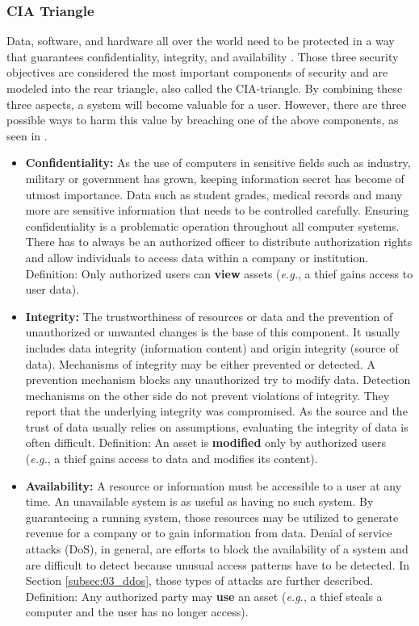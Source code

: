 \subsubsection{CIA Triangle}
Data, software, and hardware all over the world need to be protected in a way that guarantees confidentiality, integrity, and availability \cite{Pfleeger2014}. Those three security objectives are considered the most important components of security and are modeled into the rear triangle, also called the CIA-triangle. By combining these three aspects, a system will become valuable for a user. However, there are three possible ways to harm this value by breaching one of the above components, as seen in \cite{Bishop2004}.
\begin{itemize}
  \item \textbf{Confidentiality:} As the use of computers in sensitive fields such as industry, military or government has grown, keeping information secret has become of utmost importance. Data such as student grades, medical records and many more are sensitive information that needs to be controlled carefully. Ensuring confidentiality is a problematic operation throughout all computer systems. There has to always be an authorized officer to distribute  authorization rights and allow individuals to access data within a company or institution.
        \subitem Definition: Only authorized users can \textbf{view} assets (\textit{e.g.}, a thief gains access to user data).
  \item \textbf{Integrity:} The trustworthiness of resources or data and the prevention of unauthorized or unwanted changes is the base of this component. It usually includes data integrity (information content) and origin integrity (source of data). Mechanisms of integrity may be either prevented or detected. A prevention mechanism blocks any unauthorized try to modify data. Detection mechanisms on the other side do not prevent violations of integrity. They report that the underlying integrity was compromised. As the source and the trust of data usually relies on assumptions, evaluating the integrity of data is often difficult.
        \subitem Definition: An asset is \textbf{modified} only by authorized users (\textit{e.g.}, a thief gains access to data and modifies its content).
  \item \textbf{Availability:} A resource or information must be accessible to a user at any time. An unavailable system is as useful as having no such system. By guaranteeing a running system, those resources may be utilized to generate revenue for a company or to gain information from data. Denial of service attacks (DoS), in general, are efforts to block the availability of a system and are difficult to detect because unusual access patterns have to be detected. In Section \ref{subsec:03_ddos}, those types of attacks are further described.
        \subitem Definition: Any authorized party may \textbf{use} an asset (\textit{e.g.}, a thief steals a computer and the user has no longer access).
\end{itemize}

